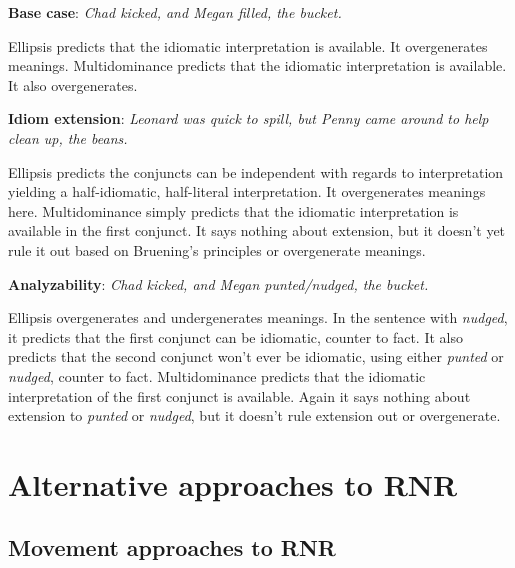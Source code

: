 \documentclass[paper=letter, fontsize=12pt]{scrartcl} %
\numberwithin{equation}{section} %
\numberwithin{figure}{section} %
\numberwithin{table}{section} %
\begin{document}
\begin{exe}
\ex \textbf{Base case}: \textit{Chad kicked, and Megan filled, the bucket.}
\begin{xlista}
\ex		Ellipsis predicts that the idiomatic interpretation is available. It overgenerates meanings.
\ex		Multidominance predicts that the idiomatic interpretation is available. It also overgenerates.
\end{xlista}
\ex \textbf{Idiom extension}: \textit{Leonard was quick to spill, but Penny came around to help clean up, the beans.}
\begin{xlista}
\ex		Ellipsis predicts the conjuncts can be independent with regards to interpretation yielding a half-idiomatic, half-literal interpretation. It overgenerates meanings here. 
\ex		Multidominance simply predicts that the idiomatic interpretation is available in the first conjunct. It says nothing about extension, but it doesn't yet rule it out based on Bruening's principles or overgenerate meanings.
\end{xlista}
\ex \textbf{Analyzability}: \textit{Chad kicked, and Megan punted/nudged, the bucket.}
\begin{xlista}
\ex		Ellipsis overgenerates and undergenerates meanings. In the sentence with \textit{nudged}, it predicts that the first conjunct can be idiomatic, counter to fact. It also predicts that the second conjunct won't ever be idiomatic, using either \textit{punted} or \textit{nudged}, counter to fact. 
\ex		Multidominance predicts that the idiomatic interpretation of the first conjunct is available. Again it says nothing about extension to \textit{punted} or \textit{nudged}, but it doesn't rule extension out or overgenerate.
\end{xlista}
\end{exe}




\section*{Alternative approaches to RNR}


\subsection*{Movement approaches to RNR}
\end{document}

